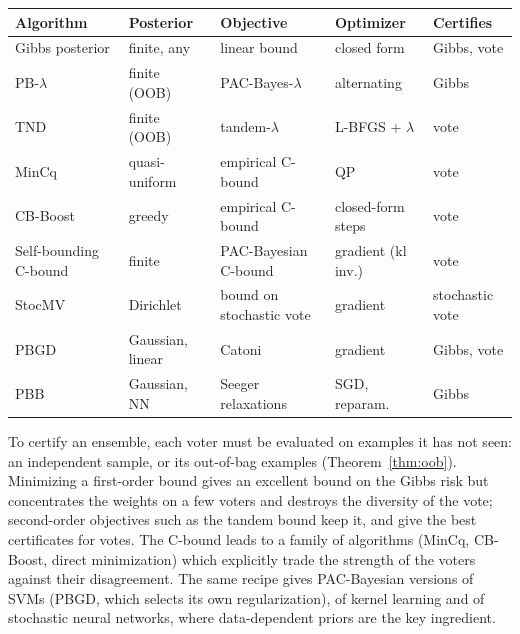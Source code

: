 \begin{center}
\small
\renewcommand{\arraystretch}{1.3}
\begin{tabular}{p{2.6cm}p{2.1cm}p{2.9cm}p{2.1cm}p{1.9cm}}
\toprule
Algorithm & Posterior & Objective & Optimizer & Certifies \\
\midrule
Gibbs posterior & finite, any & linear bound & closed form & Gibbs, vote \\
PB-$\lambda$ \citep{thiemann2017strongly} & finite (OOB) & PAC-Bayes-$\lambda$ & alternating & Gibbs \\
TND \citep{masegosa2020second} & finite (OOB) & tandem-$\lambda$ & L-BFGS + $\lambda$ & vote \\
MinCq \citep{laviolette2011from} & quasi-uniform & empirical C-bound & QP & vote \\
CB-Boost \citep{bauvin2020fast} & greedy & empirical C-bound & closed-form steps & vote \\
Self-bounding C-bound \citep{viallard2021self} & finite & PAC-Bayesian C-bound & gradient (kl inv.) & vote \\
StocMV \citep{zantedeschi2021learning} & Dirichlet & bound on stochastic vote & gradient & stochastic vote \\
PBGD \citep{germain2009pac} & Gaussian, linear & Catoni & gradient & Gibbs, vote \\
PBB \citep{perez2021tighter} & Gaussian, NN & Seeger relaxations & SGD, reparam. & Gibbs \\
\bottomrule
\end{tabular}
\end{center}

\begin{keypoints}
To certify an ensemble, each voter must be evaluated on examples it has not
seen: an independent sample, or its out-of-bag examples (Theorem~\ref{thm:oob}).
Minimizing a first-order bound gives an excellent bound on the Gibbs risk but
concentrates the weights on a few voters and destroys the diversity of the vote;
second-order objectives such as the tandem bound keep it, and give the best
certificates for votes. The C-bound leads to a family of algorithms (MinCq,
CB-Boost, direct minimization) which explicitly trade the strength of the voters
against their disagreement. The same recipe gives PAC-Bayesian versions of SVMs
(PBGD, which selects its own regularization), of kernel learning and of
stochastic neural networks, where data-dependent priors are the key ingredient.
\end{keypoints}

